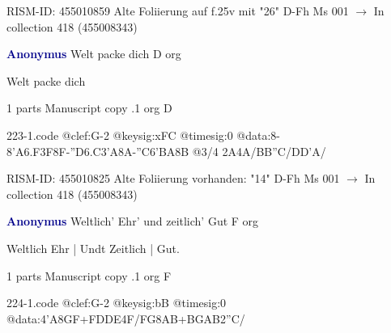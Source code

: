 \documentclass[twocolumn]{book}
\begin{document}
\newline RISM-ID: 455010859
\newline Alte Foliierung auf f.25v mit "26"
\newline D-Fh  Ms 001
\newline $\rightarrow$ In collection 418 (455008343)

\newline \par \vspace{7pt} \textcolor{darkblue}{\textbf{Anonymus  }}
\newline Welt packe dich  D  
\newline org
\newline \begin{itshape}[f.14r, at left:] Welt packe dich\end{itshape} 
\newline \textcolor{darkblue}{}  1 parts  
\newline Manuscript copy
.1  org  D  
\begin{filecontents*}{223-1.code}
@clef:G-2
@keysig:xFC
@timesig:0
@data:8-{8'A6.F3F}8F-{''D6.C3'A}8A-''C{6'BA}8B @3/4 2A4A/BB''C/DD'A/
\end{filecontents*}
\newline
%

\newline RISM-ID: 455010825
\newline Alte Foliierung vorhanden: "14"
\newline D-Fh  Ms 001
\newline $\rightarrow$ In collection 418 (455008343)

\newline \par \vspace{7pt} \textcolor{darkblue}{\textbf{Anonymus  }}
\newline Weltlich' Ehr' und zeitlich' Gut  F  
\newline org
\newline \begin{itshape}[f.32v, at left:] Weltlich Ehr | Undt Zeitlich | Gut.\end{itshape} 
\newline \textcolor{darkblue}{}  1 parts  
\newline Manuscript copy
.1  org  F  
\begin{filecontents*}{224-1.code}
@clef:G-2
@keysig:bB
@timesig:0
@data:4'A{8GF+}{FDDE}4F/FG{8AB+}{BGAB}2''C/
\end{filecontents*}
\newline
%
\end{document}
